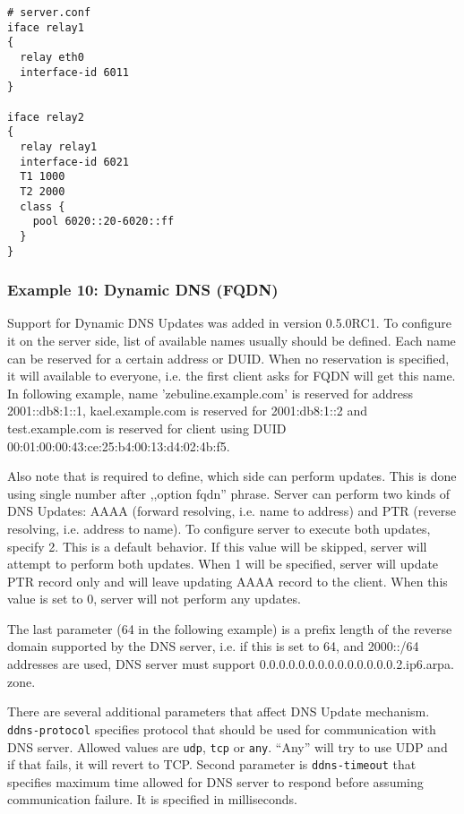 \begin{lstlisting}
# server.conf
iface relay1
{
  relay eth0
  interface-id 6011
}

iface relay2
{
  relay relay1
  interface-id 6021
  T1 1000
  T2 2000
  class {
    pool 6020::20-6020::ff
  }
}
\end{lstlisting}

\subsubsection{Example 10: Dynamic DNS (FQDN)}
\label{example-server-fqdn}

Support for Dynamic DNS Updates was added in version 0.5.0RC1. To
configure it on the server side, list of available names usually
should be defined. Each name can be reserved for a certain address or
DUID. When no reservation is specified, it will available to everyone,
i.e. the first client asks for FQDN will get this name. In following
example, name 'zebuline.example.com' is reserved for address 2001::db8:1::1,
kael.example.com is reserved for 2001:db8:1::2 and test.example.com is
reserved for client using DUID
00:01:00:00:43:ce:25:b4:00:13:d4:02:4b:f5.

Also note that is required to define, which side can perform updates.
This is done using single number after ,,option fqdn'' phrase. Server
can perform two kinds of DNS Updates: AAAA (forward resolving,
i.e. name to address) and PTR (reverse resolving, i.e. address to
name). To configure server to execute both updates, specify 2. This is
a default behavior. If this value will be skipped, server will attempt
to perform both updates. When 1 will be specified, server will update
PTR record only and will leave updating AAAA record to the
client. When this value is set to 0, server will not perform any
updates.

The last parameter (64 in the following example) is a prefix length of
the reverse domain supported by the DNS server, i.e. if this is set to
64, and 2000::/64 addresses are used, DNS server must support
0.0.0.0.0.0.0.0.0.0.0.0.0.0.2.ip6.arpa. zone.

There are several additional parameters that affect DNS Update
mechanism. \verb+ddns-protocol+ specifies protocol that should be used
for communication with DNS server.  Allowed values
are \verb+udp+, \verb+tcp+ or \verb+any+. ``Any'' will try to use UDP
and if that fails, it will revert to TCP. Second parameter
is \verb+ddns-timeout+ that specifies maximum time allowed for DNS
server to respond before assuming communication failure. It is
specified in milliseconds.

